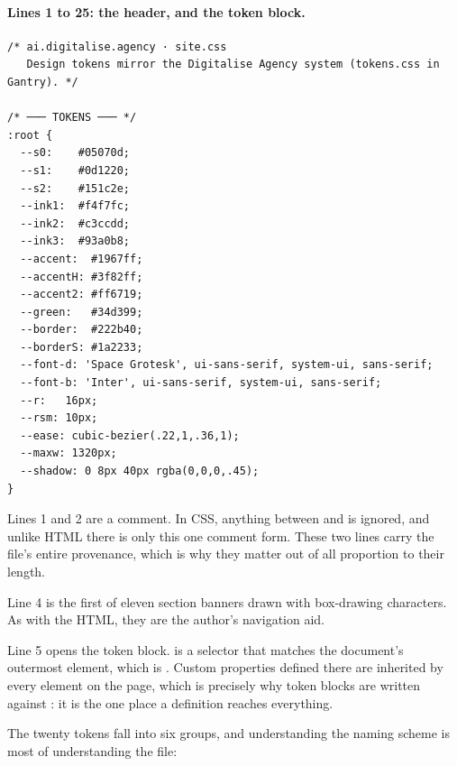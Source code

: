 \paragraph{Lines 1 to 25: the header, and the token block.}

\begin{lstlisting}[firstnumber=1,caption={\file{css/site.css}, lines 1--25}]
/* ai.digitalise.agency · site.css
   Design tokens mirror the Digitalise Agency system (tokens.css in Gantry). */

/* ─── TOKENS ─── */
:root {
  --s0:    #05070d;
  --s1:    #0d1220;
  --s2:    #151c2e;
  --ink1:  #f4f7fc;
  --ink2:  #c3ccdd;
  --ink3:  #93a0b8;
  --accent:  #1967ff;
  --accentH: #3f82ff;
  --accent2: #ff6719;
  --green:   #34d399;
  --border:  #222b40;
  --borderS: #1a2233;
  --font-d: 'Space Grotesk', ui-sans-serif, system-ui, sans-serif;
  --font-b: 'Inter', ui-sans-serif, system-ui, sans-serif;
  --r:   16px;
  --rsm: 10px;
  --ease: cubic-bezier(.22,1,.36,1);
  --maxw: 1320px;
  --shadow: 0 8px 40px rgba(0,0,0,.45);
}
\end{lstlisting}

Lines 1 and 2 are a comment. In CSS, anything between \code{/*} and \code{*/} is
ignored, and unlike HTML there is only this one comment form. These two lines
carry the file's entire provenance, which is why they matter out of all
proportion to their length.

Line 4 is the first of eleven section banners drawn with box-drawing characters.
As with the HTML, they are the author's navigation aid.

Line 5 opens the token block.  is a selector that matches the
document's outermost element, which is . Custom properties defined
there are inherited by every element on the page, which is precisely why token
blocks are written against : it is the one place a definition reaches
everything.

The twenty tokens fall into six groups, and understanding the naming scheme is
most of understanding the file:


